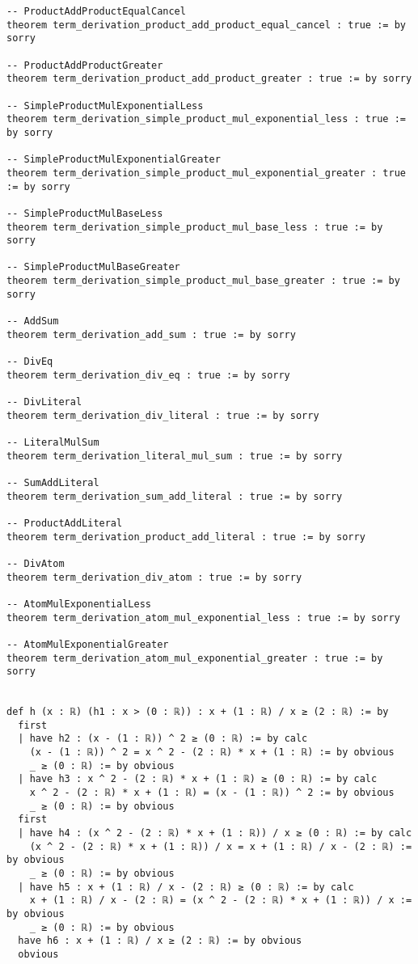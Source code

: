 \documentclass{article}
\begin{document}
\begin{tcolorbox}[colback=white!10, width=\linewidth]
\begin{lstlisting}[language=Lean4]
-- ProductAddProductEqualCancel
theorem term_derivation_product_add_product_equal_cancel : true := by sorry

-- ProductAddProductGreater
theorem term_derivation_product_add_product_greater : true := by sorry

-- SimpleProductMulExponentialLess
theorem term_derivation_simple_product_mul_exponential_less : true := by sorry

-- SimpleProductMulExponentialGreater
theorem term_derivation_simple_product_mul_exponential_greater : true := by sorry

-- SimpleProductMulBaseLess
theorem term_derivation_simple_product_mul_base_less : true := by sorry

-- SimpleProductMulBaseGreater
theorem term_derivation_simple_product_mul_base_greater : true := by sorry

-- AddSum
theorem term_derivation_add_sum : true := by sorry

-- DivEq
theorem term_derivation_div_eq : true := by sorry

-- DivLiteral
theorem term_derivation_div_literal : true := by sorry

-- LiteralMulSum
theorem term_derivation_literal_mul_sum : true := by sorry

-- SumAddLiteral
theorem term_derivation_sum_add_literal : true := by sorry

-- ProductAddLiteral
theorem term_derivation_product_add_literal : true := by sorry

-- DivAtom
theorem term_derivation_div_atom : true := by sorry

-- AtomMulExponentialLess
theorem term_derivation_atom_mul_exponential_less : true := by sorry

-- AtomMulExponentialGreater
theorem term_derivation_atom_mul_exponential_greater : true := by sorry


def h (x : ℝ) (h1 : x > (0 : ℝ)) : x + (1 : ℝ) / x ≥ (2 : ℝ) := by
  first
  | have h2 : (x - (1 : ℝ)) ^ 2 ≥ (0 : ℝ) := by calc
    (x - (1 : ℝ)) ^ 2 = x ^ 2 - (2 : ℝ) * x + (1 : ℝ) := by obvious
    _ ≥ (0 : ℝ) := by obvious
  | have h3 : x ^ 2 - (2 : ℝ) * x + (1 : ℝ) ≥ (0 : ℝ) := by calc
    x ^ 2 - (2 : ℝ) * x + (1 : ℝ) = (x - (1 : ℝ)) ^ 2 := by obvious
    _ ≥ (0 : ℝ) := by obvious
  first
  | have h4 : (x ^ 2 - (2 : ℝ) * x + (1 : ℝ)) / x ≥ (0 : ℝ) := by calc
    (x ^ 2 - (2 : ℝ) * x + (1 : ℝ)) / x = x + (1 : ℝ) / x - (2 : ℝ) := by obvious
    _ ≥ (0 : ℝ) := by obvious
  | have h5 : x + (1 : ℝ) / x - (2 : ℝ) ≥ (0 : ℝ) := by calc
    x + (1 : ℝ) / x - (2 : ℝ) = (x ^ 2 - (2 : ℝ) * x + (1 : ℝ)) / x := by obvious
    _ ≥ (0 : ℝ) := by obvious
  have h6 : x + (1 : ℝ) / x ≥ (2 : ℝ) := by obvious
  obvious

\end{lstlisting}
\end{tcolorbox}
\end{document}
